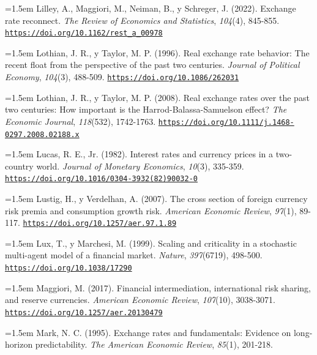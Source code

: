 \documentclass[10pt,a4paper]{article}
\begin{document}
\noindent\hangindent=1.5em Lilley, A., Maggiori, M., Neiman, B., y Schreger, J. (2022). Exchange rate reconnect. \textit{The Review of Economics and Statistics}, \textit{104}(4), 845-855. \href{https://doi.org/10.1162/rest_a_00978}{\nolinkurl{https://doi.org/10.1162/rest_a_00978}}

\noindent\hangindent=1.5em Lothian, J. R., y Taylor, M. P. (1996). Real exchange rate behavior: The recent float from the perspective of the past two centuries. \textit{Journal of Political Economy}, \textit{104}(3), 488-509. \href{https://doi.org/10.1086/262031}{\nolinkurl{https://doi.org/10.1086/262031}}

\begin{sloppypar}\noindent\hangindent=1.5em Lothian, J. R., y Taylor, M. P. (2008). Real exchange rates over the past two centuries: How important is the Harrod-Balassa-Samuelson effect? \textit{The Economic Journal}, \textit{118}(532), 1742-1763. \href{https://doi.org/10.1111/j.1468-0297.2008.02188.x}{\nolinkurl{https://doi.org/10.1111/j.1468-0297.2008.02188.x}}\end{sloppypar}

\noindent\hangindent=1.5em Lucas, R. E., Jr. (1982). Interest rates and currency prices in a two-country world. \textit{Journal of Monetary Economics}, \textit{10}(3), 335-359. \href{https://doi.org/10.1016/0304-3932(82)90032-0}{\nolinkurl{https://doi.org/10.1016/0304-3932(82)90032-0}}

\noindent\hangindent=1.5em Lustig, H., y Verdelhan, A. (2007). The cross section of foreign currency risk premia and consumption growth risk. \textit{American Economic Review}, \textit{97}(1), 89-117. \href{https://doi.org/10.1257/aer.97.1.89}{\nolinkurl{https://doi.org/10.1257/aer.97.1.89}}

\noindent\hangindent=1.5em Lux, T., y Marchesi, M. (1999). Scaling and criticality in a stochastic multi-agent model of a financial market. \textit{Nature}, \textit{397}(6719), 498-500. \href{https://doi.org/10.1038/17290}{\nolinkurl{https://doi.org/10.1038/17290}}

\noindent\hangindent=1.5em Maggiori, M. (2017). Financial intermediation, international risk sharing, and reserve currencies. \textit{American Economic Review}, \textit{107}(10), 3038-3071. \href{https://doi.org/10.1257/aer.20130479}{\nolinkurl{https://doi.org/10.1257/aer.20130479}}

\noindent\hangindent=1.5em Mark, N. C. (1995). Exchange rates and fundamentals: Evidence on long-horizon predictability. \textit{The American Economic Review}, \textit{85}(1), 201-218.
\end{document}
